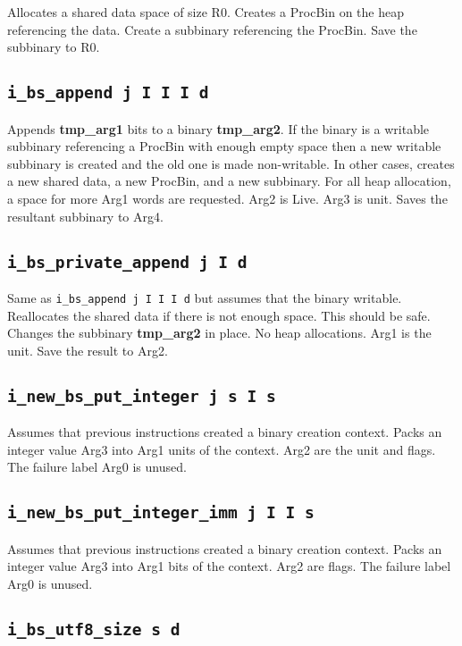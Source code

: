 \documentclass{article}
\newcommand{\tmpa}{\textbf{tmp\_arg1}}
\newcommand{\tmpb}{\textbf{tmp\_arg2}}
\newcommand{\iop}[1]{\texttt{#1}}
\begin{document}
Allocates a shared data space of size R0. Creates a ProcBin on the heap
referencing the data. Create a subbinary referencing the ProcBin. Save the
subbinary to R0.

\subsection*{\iop{i\_bs\_append j I I I d}}

Appends \tmpa{} bits to a binary \tmpb{}. If the binary is a writable subbinary
referencing a ProcBin with enough empty space then a new writable subbinary is
created and the old one is made non-writable. In other cases, creates a new
shared data, a new ProcBin, and a new subbinary. For all heap allocation, a
space for more Arg1 words are requested. Arg2 is Live. Arg3 is unit. Saves the
resultant subbinary to Arg4.

\subsection*{\iop{i\_bs\_private\_append j I d}}

Same as \iop{i\_bs\_append j I I I d} but assumes that the binary writable.
Reallocates the shared data if there is not enough space. This should be safe.
Changes the subbinary \tmpb{} in place. No heap allocations. Arg1 is the unit.
Save the result to Arg2.

\subsection*{\iop{i\_new\_bs\_put\_integer j s I s}}

Assumes that previous instructions created a binary creation context. Packs an
integer value Arg3 into Arg1 units of the context. Arg2 are the unit and flags.
The failure label Arg0 is unused.

\subsection*{\iop{i\_new\_bs\_put\_integer\_imm j I I s}}

Assumes that previous instructions created a binary creation context. Packs an
integer value Arg3 into Arg1 bits of the context. Arg2 are flags.  The failure
label Arg0 is unused.

\subsection*{\iop{i\_bs\_utf8\_size s d}}
\end{document}
